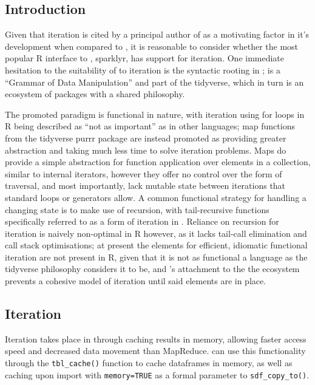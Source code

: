 \hypertarget{introduction}{%
	\subsection{Introduction}\label{sparklyr-introduction}}

Given that iteration is cited by a principal author of  as a
motivating factor in it's development when compared to , it is
reasonable to consider whether the most popular R interface to ,
sparklyr, has support for iteration\cites{zaharia2010spark,luraschi20}.
One immediate hesitation to the suitability of  to iteration is
the syntactic rooting in ;  is a ``Grammar of Data
Manipulation'' and part of the tidyverse, which in turn is an ecosystem
of packages with a shared philosophy\cite{wickham2019welcome}\cite{wickham2016r}.

The promoted paradigm is functional in nature, with iteration using for
loops in R being described as ``not as important'' as in other
languages; map functions from the tidyverse purrr package are instead
promoted as providing greater abstraction and taking much less time to
solve iteration problems. Maps do provide a simple abstraction for
function application over elements in a collection, similar to internal
iterators, however they offer no control over the form of traversal, and
most importantly, lack mutable state between iterations that standard
loops or generators allow\cite{cousineau1998functional}. A common
functional strategy for handling a changing state is to make use of
recursion, with tail-recursive functions specifically referred to as a
form of iteration in \cite{abelson1996structure}. Reliance on recursion
for iteration is naively non-optimal in R however, as it lacks tail-call
elimination and call stack optimisations\cite{rcore2020lang}; at present
the elements for efficient, idiomatic functional iteration are not
present in R, given that it is not as functional a language as the
tidyverse philosophy considers it to be, and 's attachment to
the the ecosystem prevents a cohesive model of iteration until said
elements are in place.

\hypertarget{iteration}{%
	\subsection{Iteration}\label{iteration}}

Iteration takes place in  through caching results in memory,
allowing faster access speed and decreased data movement than
MapReduce\cite{zaharia2010spark}.  can use this functionality
through the \texttt{tbl_cache()} function to
cache  dataframes in memory, as well as caching upon import with
\texttt{memory=TRUE} as a formal parameter to
\texttt{sdf_copy_to()}.

